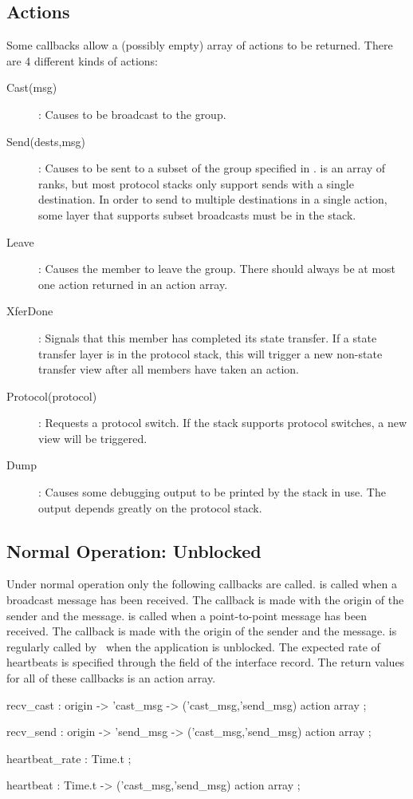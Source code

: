 \subsection{Actions}
Some callbacks allow a (possibly empty) array of actions to be 
returned.  There are 4 different kinds of actions:
\begin{description}
\item
[Cast(msg)] : Causes  to be broadcast to the group.
\item
[Send(dests,msg)] : Causes  to be sent to a subset of the group
specified in .   is an array of ranks, but most
protocol stacks only support sends with a single destination.  In order to send
to multiple destinations in a single action, some layer that supports subset
broadcasts must be in the stack.
\item
[Leave] : Causes the member to leave the group.  There should always
be at most one  action returned in an action array.
\item
[XferDone] : Signals that this member has completed its state transfer.  If a
state transfer layer is in the protocol stack, this will trigger a new
non-state transfer view after all members have taken an 
action.
\item
[Protocol(protocol)] : Requests a protocol switch.  If the stack supports
protocol switches, a new view will be triggered.
\item
[Dump] : Causes some debugging output to be printed by the stack in use.
The output depends greatly on the protocol stack.
\end{description}

\subsection{Normal Operation: Unblocked}
Under normal operation only the following callbacks are called.
 is called when a broadcast message has been received.  The
callback is made with the origin of the sender and the message.
 is called when a point-to-point message has been received.
The callback is made with the origin of the sender and the message.
 is regularly called by \ensemble\ when the application is
unblocked.  The expected rate of heartbeats is specified through the
 field of the interface record.  The return values for
all of these callbacks is an action array.
\begin{codebox}
  recv_cast             : origin -> 'cast_msg ->
    ('cast_msg,'send_msg) action array ;

  recv_send             : origin -> 'send_msg ->
    ('cast_msg,'send_msg) action array ;

  heartbeat_rate        : Time.t ;

  heartbeat             : Time.t ->
    ('cast_msg,'send_msg) action array ;
\end{codebox}

